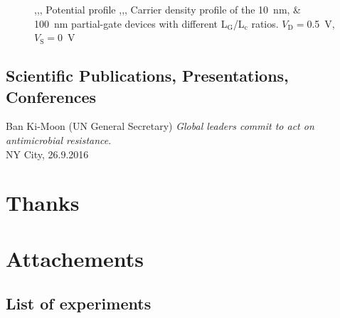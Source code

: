 \documentclass[11pt, a4paper]{article}
\newcommand{\sub}[1]{\ensuremath{_{\mathrm{#1}}}}
\newcommand{\nicefrac}[2]{#1\big/#2}
\newcommand{\Vd}{\ensuremath{V\sub{D}}}
\newcommand{\Vs}{\ensuremath{V\sub{S}}}
\begin{document}
\begin{figure}
\begin{subfigure}{0.245\linewidth}
		\caption{}\label{fig:3:5b}
	\end{subfigure}
	\caption{,,, Potential
	profile ,,, Carrier density
	profile of the \SIlist{10;100}{\nm} partial-gate devices with different
	\nicefrac{L\sub{G}}{L\sub{c}} ratios.
	$\Vd=$\SI{0.5}{V}, $\Vs=$\SI{0}{V}}
	\label{fig:3:2}
\end{figure}%
\newpage 
\begin{thebibliography}{9}

\section{Scientific Publications, Presentations, Conferences} %
Ban Ki-Moon (UN General Secretary)
\textit{Global leaders commit to act on antimicrobial resistance}. 
\\NY City, 26.9.2016

\end{thebibliography}
\section{Thanks}
\newpage
\section{Attachements}
\subsection{List of experiments} %
\end{document}
